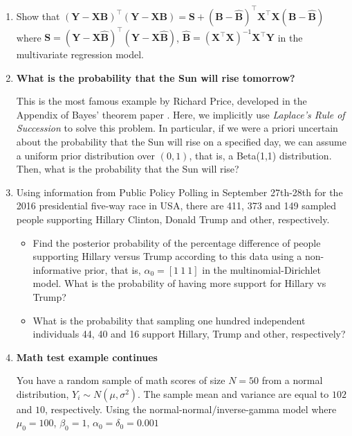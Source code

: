 \begin{enumerate}
	\item Show that $({\bm{Y}}-{\bm{X}}{\bm{B}})^{\top}({\bm{Y}}-{\bm{X}}{\bm{B}})={\bm{S}}+({\bm{B}}-\widehat{\bm{B}})^{\top}{\bm{X}}^{\top}{\bm{X}}({\bm{B}}-\widehat{\bm{B}})$ where ${\bm{S}}= ({\bm{Y}}-{\bm{X}}\widehat{\bm{B}})^{\top}({\bm{Y}}-{\bm{X}}\widehat{\bm{B}})$, $\widehat{\bm{B}}= ({\bm{X}}^{\top}{\bm{X}})^{-1}{\bm{X}}^{\top}{\bm{Y}}$ in the multivariate regression model.
	
	\item \textbf{What is the probability that the Sun will rise tomorrow?}
	
	This is the most famous example by Richard Price, developed in the Appendix of Bayes' theorem paper \cite{bayes1763lii}. Here, we implicitly use \textit{Laplace's Rule of Succession} to solve this problem. In particular, if we were a priori uncertain about the probability that the Sun will rise on a specified day, we can assume a uniform prior distribution over \((0,1)\), that is, a Beta(1,1) distribution. Then, what is the probability that the Sun will rise?
	
	\item Using information from Public Policy Polling in September 27th-28th for the 2016 presidential five-way race in USA, there are 411, 373 and 149 sampled people supporting Hillary Clinton, Donald Trump and other, respectively. 
	
	\begin{itemize}
		\item Find the posterior probability of the percentage difference of people supporting Hillary versus Trump according to this data using a non-informative prior, that is, $\alpha_0=[1 \ 1 \ 1]$ in the multinomial-Dirichlet model. What is the probability of having more support for Hillary vs Trump?
		
		\item What is the probability that sampling one hundred independent individuals 44, 40 and 16 support Hillary, Trump and other, respectively?  
	\end{itemize}

\item \textbf{Math test example continues}

You have a random sample of math scores of size $N=50$ from a normal distribution, $Y_i\sim {N}(\mu, \sigma^2)$. The sample mean and variance are equal to $102$ and $10$, respectively. Using the normal-normal/inverse-gamma model where $\mu_0=100$, $\beta_0=1$, $\alpha_0=\delta_0=0.001$


\end{enumerate}
